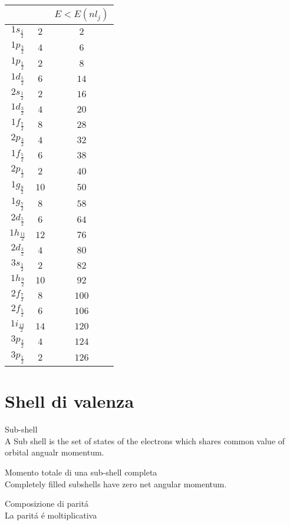 \documentclass[main.tex]{subfiles}
\begin{document}
\begin{tabular}{|c|cc|}
\hline

&&$E<E({nl}_j)$\\
\hline
$1s_{\frac{1}{2}}$ & $2$ & $2$ \\
\hline
$1p_{\frac{3}{2}}$ & $4$ & $6$ \\
$1p_{\frac{1}{2}}$ & $2$ & $8$ \\
\hline
$1d_{\frac{5}{2}}$ & $6$ & $14$ \\
$2s_{\frac{1}{2}}$ & $2$ & $16$ \\
$1d_{\frac{3}{2}}$ & $4$ & $20$ \\
\hline
$1f_{\frac{7}{2}}$ & $8$ & $28$ \\
\hline
$2p_{\frac{3}{2}}$ & $4$ & $32$ \\
$1f_{\frac{5}{2}}$ & $6$ & $38$ \\
$2p_{\frac{1}{2}}$ & $2$ & $40$ \\
$1g_{\frac{9}{2}}$ & $10$ & $50$ \\
\hline
$1g_{\frac{7}{2}}$ & $8$ & $58$ \\
$2d_{\frac{5}{2}}$ & $6$ & $64$ \\
$1h_{\frac{11}{2}}$ & $12$ & $76$ \\
$2d_{\frac{3}{2}}$ & $4$ & $80$ \\
$3s_{\frac{1}{2}}$ & $2$ & $82$ \\
\hline
$1h_{\frac{9}{2}}$ & $10$ & $92$ \\
$2f_{\frac{7}{2}}$ & $8$ & $100$ \\
$2f_{\frac{5}{2}}$ & $6$ & $106$ \\
$1i_{\frac{13}{2}}$ & $14$ & $120$ \\
$3p_{\frac{3}{2}}$ & $4$ & $124$ \\
$3p_{\frac{1}{2}}$ & $2$ & $126$ \\
\hline

\end{tabular}


\section{Shell di valenza}

\begin{enumerate*}
\item Sub-shell\\
A Sub shell is the set of states of the electrons which shares common value of orbital angualr momentum.
\item Momento totale di una sub-shell completa\\
Completely filled subshells have zero net angular momentum.
\item Composizione di parit\'a\\
La parit\'a \'e moltiplicativa
\end{enumerate*}
\end{document}

